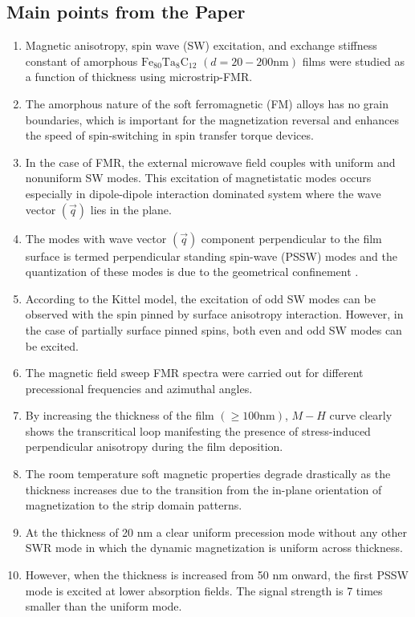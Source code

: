 \subsection*{Main points from the Paper}
\begin{enumerate}
    \item Magnetic anisotropy, spin wave (SW) excitation, and exchange stiffness constant of amorphous $\mathrm{Fe_{80}Ta_8C_{12}}$ $(d=20 - 200 \mathrm{nm})$ films were studied as a function of thickness using microstrip-FMR.
    \item The amorphous nature of the soft ferromagnetic (FM) alloys has no grain boundaries, which is important for the magnetization reversal and enhances the speed of spin-switching in spin transfer torque devices.
    \item In the case of FMR, the external microwave field couples with uniform and nonuniform SW modes. This excitation of magnetistatic modes occurs especially in dipole-dipole interaction dominated system where the wave vector $(\vec{q})$ lies in the plane.
    \item The modes with wave vector $(\vec{q})$ component perpendicular to the film surface is termed perpendicular standing spin-wave (PSSW) modes and the quantization of these modes is due to the geometrical confinement \cite{gui2007quantized}. 
    \item According to the Kittel model, the excitation of odd SW modes can be observed with the spin pinned by surface anisotropy interaction. However, in the case of partially surface pinned spins, both even and odd SW modes can be excited.
    \item The magnetic field sweep FMR spectra were carried out for different precessional frequencies and azimuthal angles.
    \item By increasing the thickness of the film $(\geq100 \mathrm{nm})$, $M-H$ curve clearly shows the transcritical loop manifesting the presence of stress-induced perpendicular anisotropy during the film deposition.
    \item The room temperature soft magnetic properties degrade drastically as the thickness increases due to the transition from the in-plane orientation of magnetization to the strip domain patterns.
    \item At the thickness of 20 nm a clear uniform precession mode without any other SWR mode in which the dynamic magnetization is uniform across thickness. 
    \item However, when the thickness is increased from 50 nm onward, the first PSSW mode is excited at lower absorption fields. The signal strength is 7 times smaller than the uniform mode.

\end{enumerate}
